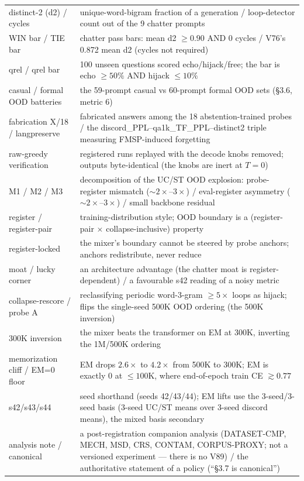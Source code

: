 \documentclass[11pt]{article}
\begin{document}
\begin{table}[!t]
\begin{tabular}{p{4.4cm}p{11.2cm}}
distinct-2 (d2) / cycles & unique-word-bigram fraction of a generation / loop-detector count out of the 9 chatter prompts \\
WIN bar / TIE bar & chatter pass bars: mean d2 $\geq 0.90$ AND 0 cycles / V76's 0.872 mean d2 (cycles not required) \\
qrel / qrel bar & 100 unseen questions scored echo/hijack/free; the bar is echo $\geq 50\%$ AND hijack $\leq 10\%$ \\
casual / formal OOD batteries & the 59-prompt casual vs 60-prompt formal OOD sets (\S3.6, metric 6) \\
fabrication X/18 / langpreserve & fabricated answers among the 18 abstention-trained probes / the discord\_PPL--qa1k\_TF\_PPL--distinct2 triple measuring FMSP-induced forgetting \\
raw-greedy verification & registered runs replayed with the decode knobs removed; outputs byte-identical (the knobs are inert at $T = 0$) \\
\midrule
M1 / M2 / M3 & decomposition of the UC/ST OOD explosion: probe-register mismatch ($\sim$$2\times$--$3\times$) / eval-register asymmetry ($\sim$$2\times$--$3\times$) / small backbone residual \\
register / register-pair & training-distribution style; OOD boundary is a (register-pair $\times$ collapse-inclusive) property \\
register-locked & the mixer's boundary cannot be steered by probe anchors; anchors redistribute, never reduce \\
moat / lucky corner & an architecture advantage (the chatter moat is register-dependent) / a favourable s42 reading of a noisy metric \\
collapse-rescore / probe A & reclassifying periodic word-3-gram $\geq 5\times$ loops as hijack; flips the single-seed 500K OOD ordering (the 500K inversion) \\
300K inversion & the mixer beats the transformer on EM at 300K, inverting the 1M/500K ordering \\
memorization cliff / EM=0 floor & EM drops $2.6\times$ to $4.2\times$ from 500K to 300K; EM is exactly 0 at $\leq 100$K, where end-of-epoch train CE $\gtrsim 0.77$ \\
\midrule
s42/s43/s44 & seed shorthand (seeds 42/43/44); EM lifts use the 3-seed/3-seed basis (3-seed UC/ST means over 3-seed discord means), the mixed basis secondary \\
analysis note / canonical & a post-registration companion analysis (DATASET-CMP, MECH, MSD, CRS, CONTAM, CORPUS-PROXY; not a versioned experiment --- there is no V89) / the authoritative statement of a policy (``\S3.7 is canonical'') \\
\bottomrule
\end{tabular}
\end{table}
\end{document}
